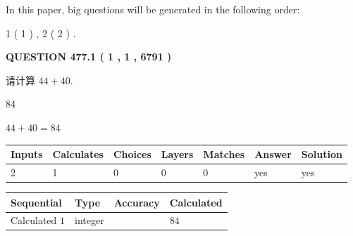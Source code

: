 \documentclass{ctexart}
\begin{document}
In this paper, big questions will be generated in the following order: 
   
   
   1 ( 1 )
 ,
   2 ( 2 )
 .
  
\vspace{0.2in}
  
{\textbf{\Large{QUESTION
477.1 
 ( 1 , 1 , 6791 )
}}}
  
  
 
请计算 $ %
44 +  %
40 $.
 
 
 
\noindent{}
 
 

84
 
 
\noindent{}
 
 

 
 
 
\noindent{}
 
 

$ %
44 +  %
40=   %
84$
 
 
\noindent{}
 
 

 
   
   
   
   
\noindent\begin{tabular}{|l|l|l|l|l|l|l|}
 \hline
Inputs & Calculates & Choices & Layers & Matches & Answer & Solution \\ \hline
 2  & 
 1  & 
 0
  & 
 0  & 
 0  & 
  yes & 
  yes 
  \\ \hline
 \end{tabular}
   
   
   
   
\noindent{}
   
   
  
  
\noindent\begin{tabular}{|l|l|l|l|}
\hline
 Sequential & Type & Accuracy & Calculated \\ 
\hline
 
 
  Calculated $  1 $ & integer &  & 
  $ 84 $ 
 \\  \hline  
 \end{tabular}
   
\end{document}
